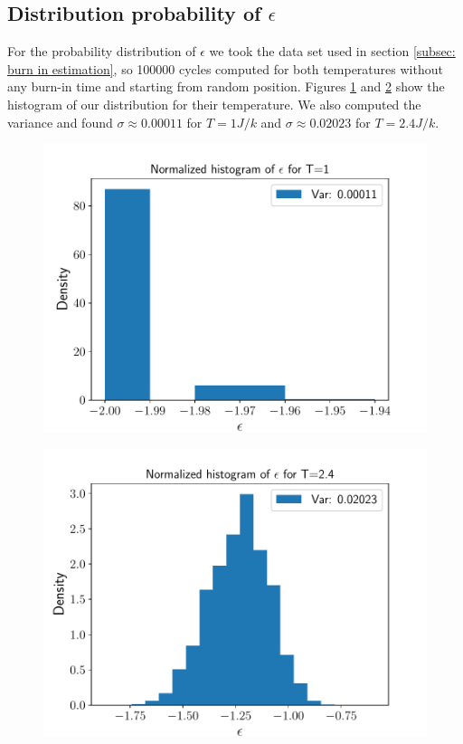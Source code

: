 \documentclass[english,notitlepage,reprint,nofootinbib]{revtex4-2}  %
\begin{document}
	\subsection{Distribution probability of $\epsilon$}\label{subsec:dist probability}
	
	For the probability distribution of $\epsilon$ we took the data set used in section 
	\ref{subsec: burn in estimation}, so 100000 cycles computed for both temperatures 
	without any burn-in time and starting from random position. Figures \ref{fig:hist1}
	and \ref{fig:hist2} show the histogram of our distribution for their temperature. 
	We also computed the variance and found $\sigma\approx0.00011$ for $T=1 J/k$ and 
	$\sigma\approx0.02023$ for $T=2.4 J/k$.
	
	\begin{figure}[h!]
		\centering
		\includegraphics[scale=0.55]{figures/Histo_T1.pdf}
		\caption{}
		\label{fig:hist1}
	\end{figure}

	\begin{figure}[h!]
		\centering
		\includegraphics[scale=0.55]{figures/Histo_T2.pdf}
		\caption{}
		\label{fig:hist2}
	\end{figure}
\end{document}
